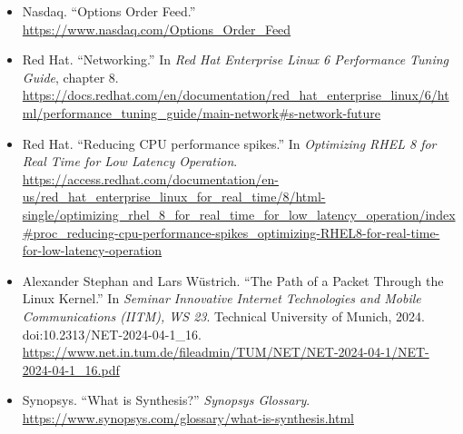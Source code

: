\documentclass{article}
\begin{document}
\begin{itemize}
	\item Nasdaq. ``Options Order Feed.'' \url{https://www.nasdaq.com/Options_Order_Feed}
	\item Red Hat. ``Networking.'' In \textit{Red Hat Enterprise Linux 6 Performance Tuning Guide}, chapter 8. \url{https://docs.redhat.com/en/documentation/red_hat_enterprise_linux/6/html/performance_tuning_guide/main-network#s-network-future}
	\item Red Hat. ``Reducing CPU performance spikes.'' In \textit{Optimizing RHEL 8 for Real Time for Low Latency Operation}. \url{https://access.redhat.com/documentation/en-us/red_hat_enterprise_linux_for_real_time/8/html-single/optimizing_rhel_8_for_real_time_for_low_latency_operation/index#proc_reducing-cpu-performance-spikes_optimizing-RHEL8-for-real-time-for-low-latency-operation}
	\item Alexander Stephan and Lars W\"ustrich. ``The Path of a Packet Through the Linux Kernel.'' In \textit{Seminar Innovative Internet Technologies and Mobile Communications (IITM), WS 23}. Technical University of Munich, 2024. doi:10.2313/NET-2024-04-1\_16. \url{https://www.net.in.tum.de/fileadmin/TUM/NET/NET-2024-04-1/NET-2024-04-1_16.pdf}
	\item Synopsys. ``What is Synthesis?'' \textit{Synopsys Glossary}. \url{https://www.synopsys.com/glossary/what-is-synthesis.html}
\end{itemize}
\end{document}
